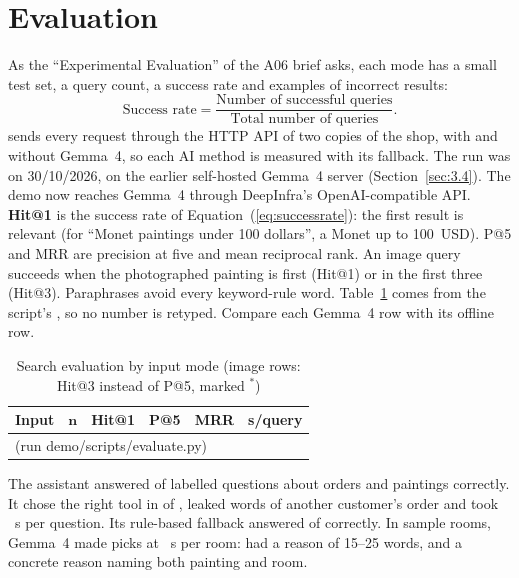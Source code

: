 \section{Evaluation}\label{sec:3.12}\label{sec:aieval}

As the ``Experimental Evaluation'' of the A06 brief asks, each mode has a small test set, a query count, a success
rate and examples of incorrect results:
\begin{equation}
\text{Success rate} = \frac{\text{Number of successful queries}}{\text{Total number of queries}}.
\label{eq:successrate}
\end{equation}
 sends every request through the HTTP API of two copies of the shop, with and without
Gemma~4, so each AI method is measured with its fallback. The run was on 30/10/2026, on the earlier self-hosted Gemma~4
server (Section~\ref{sec:3.4}). The demo now reaches Gemma~4 through DeepInfra's OpenAI-compatible API.
\textbf{Hit@1} is the success rate of Equation~(\ref{eq:successrate}): the first result is relevant (for ``Monet
paintings under 100 dollars'', a Monet up to 100~USD). P@5 and MRR are precision at five and mean reciprocal rank.
An image query succeeds when the photographed painting is first (Hit@1) or in the first three (Hit@3). Paraphrases
avoid every keyword-rule word. Table~\ref{tab:evalsearch} comes from the script's , so no number
is retyped. Compare each Gemma~4 row with its offline row.

\providecommand{\evalSearchRows}{\multicolumn{6}{l}{\small (run demo/scripts/evaluate.py)}\\}

\begin{table}[htbp]
\centering\small
\caption{Search evaluation by input mode (image rows: Hit@3 instead of P@5, marked $^*$)}\label{tab:evalsearch}
\begin{tabular}{@{}lrrrrr@{}}
\toprule
\textbf{Input} & $\boldsymbol{n}$ & \textbf{Hit@1} & \textbf{P@5} & \textbf{MRR} & \textbf{s/query}\\
\midrule
\evalSearchRows
\bottomrule
\end{tabular}
\end{table}

The assistant answered \evAsstGemmaCorrect{} of \evAsstGemmaN{} labelled questions about orders and paintings
correctly. It chose the right tool in \evAsstGemmaTool{} of \evAsstGemmaN{}, leaked \evAsstGemmaLeaks{} words of
another customer's order and took \evAsstGemmaSec~s per question. Its rule-based fallback answered
\evAsstRulesCorrect{} of \evAsstRulesN{} correctly. In \evRoomGemmaRooms{} sample rooms, Gemma~4 made
\evRoomGemmaPicks{} picks at \evRoomGemmaSec~s per room: \evRoomGemmaLength{} had a reason of 15--25 words, and
\evRoomGemmaConcrete{} a concrete reason naming both painting and room.

